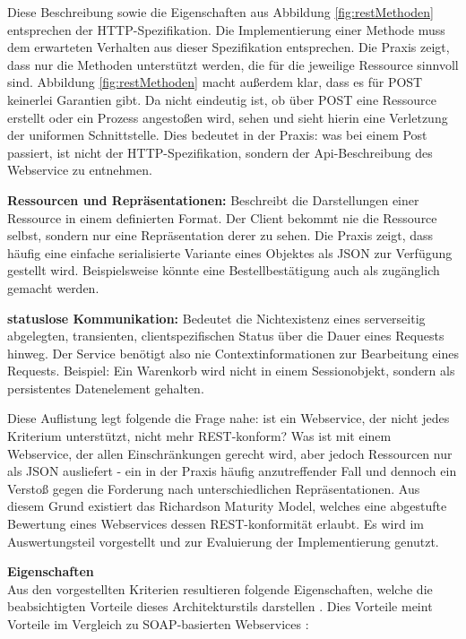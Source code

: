 \documentclass[12pt,a4paper,bibliography=totocnumbered,listof=totoc]{scrartcl}
\begin{document}
\begin{compactitem}
Diese Beschreibung sowie die Eigenschaften aus Abbildung \ref{fig:restMethoden} entsprechen der HTTP-Spezifikation. Die Implementierung einer Methode muss dem erwarteten Verhalten aus dieser Spezifikation entsprechen. Die Praxis zeigt, dass nur die Methoden unterstützt werden, die für die jeweilige Ressource sinnvoll sind. Abbildung \ref{fig:restMethoden} macht außerdem klar, dass es für POST keinerlei Garantien gibt. Da nicht eindeutig ist, ob über POST eine Ressource erstellt oder ein Prozess angestoßen wird, sehen \citeauthor{richardson07} und sieht hierin eine Verletzung der uniformen Schnittstelle. Dies bedeutet in der Praxis: was bei einem Post passiert, ist nicht der HTTP-Spezifikation, sondern der Api-Beschreibung des Webservice zu entnehmen.
\item \textbf{Ressourcen und Repräsentationen:} Beschreibt die Darstellungen einer Ressource in einem definierten Format. Der Client bekommt nie die Ressource selbst, sondern nur eine Repräsentation derer zu sehen. Die Praxis zeigt, dass häufig eine einfache serialisierte Variante eines Objektes als JSON zur Verfügung gestellt wird. Beispielsweise könnte eine Bestellbestätigung auch als zugänglich gemacht werden.
\item \textbf{statuslose Kommunikation:} Bedeutet die Nichtexistenz eines serverseitig abgelegten, transienten, clientspezifischen Status über die Dauer eines Requests hinweg. Der Service benötigt also nie Contextinformationen zur Bearbeitung eines Requests. Beispiel: Ein Warenkorb wird nicht in einem Sessionobjekt, sondern als persistentes Datenelement gehalten.
\end{compactitem}

Diese Auflistung legt folgende die Frage nahe: ist ein Webservice, der nicht jedes Kriterium unterstützt, nicht mehr REST-konform? Was ist mit einem Webservice, der allen Einschränkungen gerecht wird, aber jedoch Ressourcen nur als JSON ausliefert - ein in der Praxis häufig anzutreffender Fall und dennoch ein Verstoß gegen die Forderung nach unterschiedlichen Repräsentationen. Aus diesem Grund existiert das \glqq Richardson Maturity Model\grqq{}, welches eine abgestufte Bewertung eines Webservices dessen REST-konformität erlaubt. Es wird im Auswertungsteil vorgestellt und zur Evaluierung der Implementierung genutzt.

\textbf{Eigenschaften}\\
Aus den vorgestellten Kriterien resultieren folgende Eigenschaften, welche die beabsichtigten Vorteile dieses Architekturstils darstellen \citep{tilkov11}. Dies Vorteile meint Vorteile im Vergleich zu SOAP-basierten Webservices \citep{richardson07}:
\end{document}

